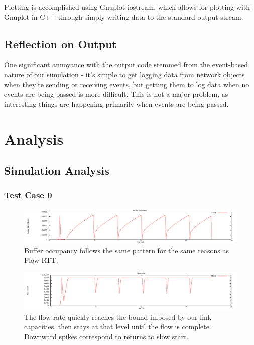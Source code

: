 \documentclass[12pt]{article}
\begin{document}
Plotting is accomplished using Gnuplot-iostream, which allows for plotting with Gnuplot in C++ through simply writing data to the standard output stream.

\subsection*{Reflection on Output}
One significant annoyance with the output code stemmed from the event-based nature of our simulation - it’s simple to get logging data from network objects when they’re sending or receiving events, but getting them to log data when no events are being passed is more difficult. This is not a major problem, as interesting things are happening primarily when events are being passed.


\section{Analysis}


\subsection{Simulation Analysis}
\subsubsection{Test Case 0}

\begin{figure}[!ht]
\centering \includegraphics[bb= 0 0 1300 250, scale=.35]{figures/Test0_Tahoe/buffer_occ.png}
\caption{Buffer occupancy follows the same pattern for the same reasons as Flow RTT.}
\label{fig:test0_tahoe_buffer_occ}
\end{figure}

\begin{figure}[!ht]
\centering \includegraphics[bb= 0 0 1300 250, scale=.35]{figures/Test0_Tahoe/flow_rate.png}
\caption{The flow rate quickly reaches the bound imposed by our link capacities, then stays at that level until the flow is complete. Downward spikes correspond to returns to slow start.}
\label{fig:test0_tahoe_flow_rate}
\end{figure}
\end{document}
